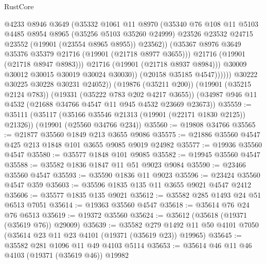 \begin{lexlean}{RustCore}
\begin{coremodule}
                          @4233
                          @8946
                          @3649
                          (@35332
                            @1061
                            @11
                            @8970
                            (@35340
                              @76
                              @108
                              @11
                              @5103
                              @4485
                              @8954
                              @8965
                              (@35256 @5103 @35260 @24999)
                              @23526
                              @23532
                              @24715
                              @23552
                              (@19901 (@23554 @8965 @8955))
                              @23562))
                          (@35367 @8976 @3649 @35376 @35379 @21716 (@19901 (@21718 @8977 @3655)))
                          @21716
                          (@19901 (@21718 @8947 @8983)))
                        @21716
                        (@19901 (@21718 @8937 @8984)))
                      @30009
                      @30012
                      @30015
                      @30019
                      @30024
                      @30030))
                  (@20158 @35185 @4547))))))
        @30222
        @30225
        @30228
        @30231
        @24052))
    (@19876 (@35211 @200))
    (@19901 (@35215 @2124 @783))
    (@19331 (@35222 @783 @202 @4217 @3655))
    (@34987 @946 @11 @4532 (@21688 @34766 @4547 @11 @945 @4532 @23669 @23673))
@35559 := @35111
    (@35117 (@35166 @35546 @21313 (@19901 (@22171 @1830 @2125)) @21326))
    (@19901 (@25560 @34766 @234))
@35560 := @19808 @34766
@35565 := @21877 @35560 @1849 @213 @3655 @9086
@35575 := @21886 @35560 @4547 @425 @213 @1848 @101 @3655 @9085 @9019 @24982
@35577 := @19936 @35560 @4547
@35580 := @35577 @1848 @101 @9085
@35582 := @19945 @35560 @4547
@35588 := @35582 @1836 @1847 @11 @51 @9023 @9084
@35590 := @23466 @35560 @4547
@35593 := @35590 @1836 @11 @9023
@35596 := @23424 @35560 @4547 @359
@35603 := @35596 @1835 @135 @11 @3655 @9021 @4547 @2412
@35606 := @35577 @1835 @135 @9021
@35612 := @35582 @285 @1493 @24 @51 @6513 @7051
@35614 := @19363 @35560 @4547
@35618 := @35614 @76 @24 @76 @6513
@35619 := @19372 @35560
@35624 := @35612 (@35618 (@19371 (@35619 @76)) @29009)
@35639 := @35582
    @279
    @1492
    @11
    @50
    @4101
    @7050
    (@35614 @23 @11 @23 @4101 (@19371 (@35619 @23)) @19965)
@35645 := @35582 @281 @1096 @11 @49 @4103 @5114
@35653 := @35614 @46 @11 @46 @4103 (@19371 (@35619 @46)) @19982

\end{coremodule}
\end{lexlean}
